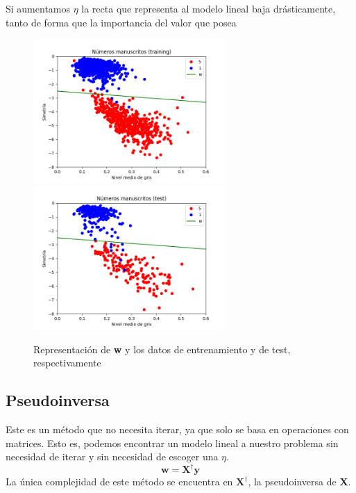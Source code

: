 \documentclass{article}
\begin{document}
    Si aumentamos $\eta$ la recta que representa al modelo lineal baja drásticamente, tanto de
    forma que la importancia del valor que posea
    \pagebreak
    \begin{figure}[h]
        \caption{Representación de \textbf{w} y los datos de entrenamiento y de test, respectivamente}
        \centering
        \includegraphics[width=0.65\textwidth]{Figure_4.png}
        \includegraphics[width=0.65\textwidth]{Figure_5.png}
    \end{figure}





    \pagebreak
    \subsection{Pseudoinversa}
    Este es un método que no necesita iterar, ya que solo se basa en operaciones con matrices.
    Esto es, podemos encontrar un modelo lineal a nuestro problema sin necesidad de iterar
    y sin necesidad de escoger una $\eta$.
    \begin{equation*}
        \textbf{w} = \textbf{X}^\dagger \textbf{y}
    \end{equation*}
    La única complejidad de este método se encuentra en $\textbf{X}^\dagger$, la pseudoinversa de \textbf{X}.
\end{document}
